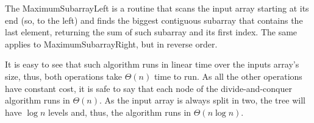 \documentclass[a4paper]{report}
\begin{document}
The MaximumSubarrayLeft is a routine that scans the input array starting at its end (so, to the left) and finds the biggest contiguous subarray that contains the last element, returning the sum of such subarray and its first index. The same applies to MaximumSubarrayRight, but in reverse order.


It is easy to see that such algorithm runs in linear time over the inputs array's size, thus, both operations take $\Theta\left( n \right) $ time to run. As all the other operations have constant cost, it is safe to say that each node of the divide-and-conquer algorithm runs in $\Theta\left( n \right) $. As the input array is always split in two, the tree will have $\log n$ levels and, thus, the algorithm runs in $\Theta\left( n \log n \right) $.
\end{document}
